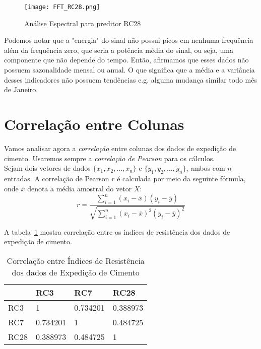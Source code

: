 \begin{figure}[H]
\centering
\texttt{[image: FFT\_RC28.png]}
\caption{Análise Espectral para preditor RC28}
\end{figure}


Podemos notar que a "energia" do sinal não possui picos em nenhuma frequência além da frequência zero, que seria a potência média do sinal, ou seja, uma componente que não depende do tempo. Então, afirmamos que esses dados não possuem sazonalidade mensal ou anual. O que significa que a média e a variância desses indicadores não possuem tendências e.g. alguma mudança similar todo mês de Janeiro.


\section{Correlação entre Colunas}

Vamos analisar agora a \textit{correlação} entre colunas dos dados de expedição
de cimento. Usaremos sempre a \textit{correlação de Pearson} para os cálculos.
\\
Sejam dois vetores de
dados $\{x_1,x_2, \dots , x_n\}$ e $\{y_1,y_2, \dots , y_n\}$, ambos com $n$ entradas. A correlação de Pearson $r$ é calculada
por meio da seguinte fórmula, onde $\overline{x}$ denota a média amostral do
vetor $X$: \\



\[ r = \frac{{}\sum_{i=1}^{n} (x_i - \overline{x})(y_i - \overline{y})}
{\sqrt{\sum_{i=1}^{n} (x_i - \overline{x})^2(y_i - \overline{y})^2}} \] 


\bigskip


A tabela~\ref{tb:corr3728} mostra correlação entre os índices de resistência dos dados de
expedição de cimento. \\

\begin{table}[H]
\label{tb:corr3728}
\centering
\begin{tabular}{l|lll}
\cline{2-4}
\textbf{}                  & \multicolumn{1}{l|}{RC3} & \multicolumn{1}{l|}{RC7} & \multicolumn{1}{l|}{RC28} \\ \hline
\multicolumn{1}{|l|}{RC3}  & 1                        & 0.734201                 & 0.388973                  \\ \cline{1-1}
\multicolumn{1}{|l|}{RC7}  & 0.734201                 & 1                        & 0.484725                  \\ \cline{1-1}
\multicolumn{1}{|l|}{RC28} & 0.388973                 & 0.484725                 & 1                         \\ \cline{1-1}
\end{tabular}
\caption{Correlação entre Índices de Resistência dos dados de
  Expedição de Cimento}
\end{table}







